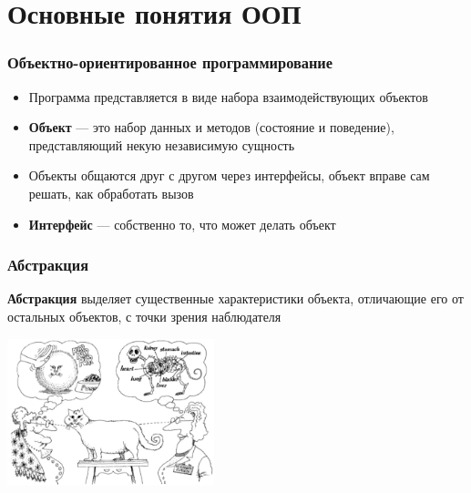 \documentclass{../../slides-style}
\begin{document}
    
    \begin{frame}[plain]
        \titlepage
    \end{frame}

    \section{Основные понятия ООП}

    \begin{frame}
        \frametitle{Объектно-ориентированное программирование}
        \begin{itemize}
            \item Программа представляется в виде набора взаимодействующих объектов
            \item \textbf{Объект} --- это набор данных и методов (состояние и поведение), представляющий некую независимую сущность
            \item Объекты общаются друг с другом через интерфейсы, объект вправе сам решать, как обработать вызов
            \item \textbf{Интерфейс} --- собственно то, что может делать объект
        \end{itemize}
    \end{frame}

    \begin{frame}
        \frametitle{Абстракция}
        \textbf{Абстракция} выделяет существенные характеристики объекта, отличающие его от остальных объектов, с точки зрения наблюдателя
        \vskip 1cm
        \begin{center}
            \includegraphics[width=0.45\textwidth]{abstraction.png}
        \end{center}
    \end{frame}
\end{document}
